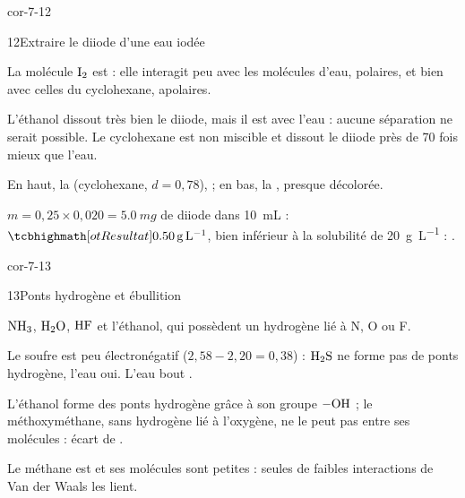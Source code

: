 \begin{blocLivre}{cor-7-12}
\begin{corrige}{12}{Extraire le diiode d'une eau iodée}
\begin{questions}
\item La molécule $\ce{I2}$ est  : elle interagit peu avec les molécules d'eau, polaires, et bien avec celles du
cyclohexane, apolaires.
\item L'éthanol dissout très bien le diiode, mais il est  avec l'eau : aucune séparation ne serait possible. Le
cyclohexane est non miscible et dissout le diiode près de 70 fois mieux que l'eau.
\item En haut, la  (cyclohexane, $d=0{,}78$),  ; en bas, la , presque décolorée.
\item $m=0{,}25\times0{,}020=\qty{5,0}{mg}$ de diiode dans \qty{10}{mL} : $\res{\qty{0,50}{g.L^{-1}}}$, bien inférieur à la solubilité de \qty{20}{g.L^{-1}} :
.
\end{questions}
\end{corrige}
\end{blocLivre}
\begin{blocLivre}{cor-7-13}
\begin{corrige}{13}{Ponts hydrogène et ébullition}
\begin{questions}
\item $\ce{NH3}$, $\ce{H2O}$, $\ce{HF}$ et l'éthanol, qui possèdent un hydrogène lié à N, O ou F.
\item Le soufre est peu électronégatif ($2{,}58-2{,}20=0{,}38$) : $\ce{H2S}$ ne forme pas de ponts hydrogène, l'eau oui. L'eau bout
.
\item L'éthanol forme des ponts hydrogène grâce à son groupe $\ce{-OH}$ ; le méthoxyméthane, sans hydrogène lié à l'oxygène, ne
le peut pas entre ses molécules : écart de .
\item Le méthane est  et ses molécules sont petites : seules de faibles interactions de Van der Waals les lient.
\end{questions}
\end{corrige}
\end{blocLivre}
